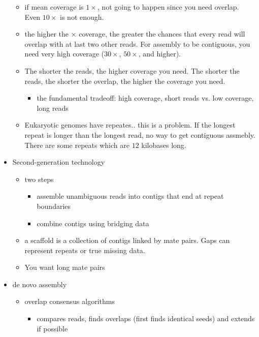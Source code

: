 \documentclass{article}
\newcommand{\fold}[1]{$#1\times$}
\begin{document}
\begin{itemize}
\begin{itemize}
            \item if mean coverage is \fold{1}, not going to happen since you need overlap.  Even \fold{10} is not enough.
            \item the higher the \fold{} coverage, the greater the chances that every read will overlap with at last two other reads.  For assembly to be contiguous, you need very high coverage (\fold{30}, \fold{50}, and higher).
            \item The shorter the reads, the higher coverage you need.  The shorter the reads, the shorter the overlap, the higher the coverage you need.
            \begin{itemize}
                \item the fundamental tradeoff: high coverage, short reads vs. low coverage, long reads
            \end{itemize}
            \item Eukaryotic genomes have repeates.. this is a problem.  If the longest repeat is longer than the longest read, no way to get contiguous assmebly.  There are some repeats which are $12$ kilobases long.
        \end{itemize}
        \item Second-generation technology
        \begin{itemize}
            \item two steps
            \begin{itemize}
                \item assemble unambiguous reads into contigs that end at repeat boundaries
                \item combine contigs using bridging data
            \end{itemize}
            \item a scaffold is a collection of contigs linked by mate pairs.  Gaps can represent repeats or true missing data.
            \item You want long mate pairs
        \end{itemize}
        \item de novo assembly
        \begin{itemize}
            \item overlap consensus algorithms
            \begin{itemize}
                \item compares reads, finds overlaps (first finds identical seeds) and extends if possible
            \end{itemize}

\end{itemize}
\end{itemize}
\end{document}
